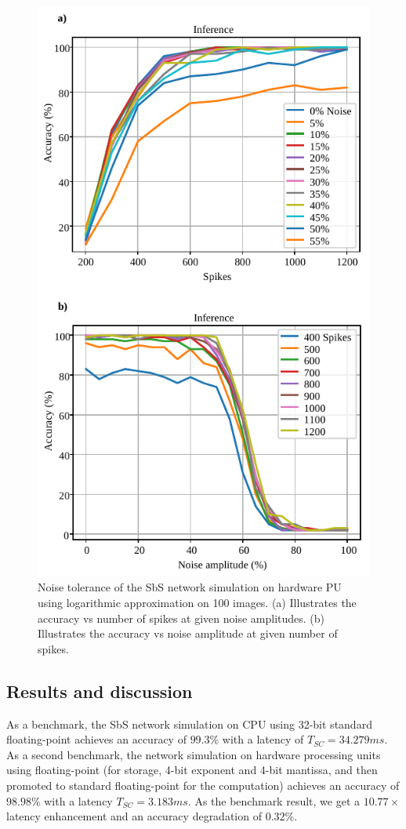 \begin{figure}[h!]
	\centering
	\includegraphics[width=1\columnwidth]{../figures/accuracy_vs_noise_pu_log.pdf}
	\caption{Noise tolerance of the SbS network simulation on hardware PU using logarithmic approximation on 100 images. (a) Illustrates the accuracy vs number of spikes at given noise amplitudes. (b) Illustrates the accuracy vs noise amplitude at given number of spikes.}
	\label{fig:accuracy_vs_noise_pu_log}
\end{figure}


\subsection{Results and discussion}
As a benchmark, the SbS network simulation on CPU using 32-bit standard floating-point achieves an accuracy of $99.3\%$ with a latency of $T_{SC} = 34.279ms$. As a second benchmark, the network simulation on hardware processing units using floating-point (for storage, 4-bit exponent and 4-bit mantissa, and then promoted to standard floating-point for the computation) achieves an accuracy of $98.98\%$ with a latency $T_{SC}=3.183ms$. As the benchmark result, we get a $10.77\times$ latency enhancement and an accuracy degradation of $0.32\%$.

